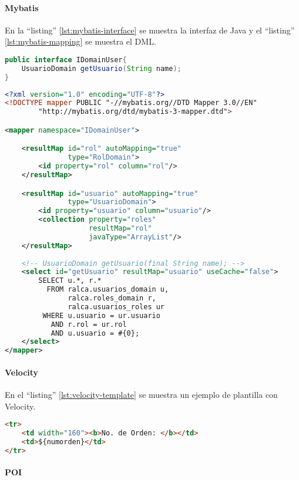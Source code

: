 \paragraph{Mybatis}\cite{MyBatis}
En la ``listing'' \ref{lst:mybatis-interface} se muestra la interfaz de Java y el ``listing'' \ref{lst:mybatis-mapping} se muestra el DML. 
\begin{lstlisting}[language=Java, caption={Ejemplo de MyBatis}, label={lst:mybatis-interface}]
public interface IDomainUser{
	UsuarioDomain getUsuario(String name);
}
\end{lstlisting}

\begin{lstlisting}[language=XML, caption={Ejemplo de MyBatis}, label={lst:mybatis-mapping}]
<?xml version="1.0" encoding="UTF-8"?>
<!DOCTYPE mapper PUBLIC "-//mybatis.org//DTD Mapper 3.0//EN"
		"http://mybatis.org/dtd/mybatis-3-mapper.dtd">

<mapper namespace="IDomainUser">

	<resultMap id="rol" autoMapping="true"
			   type="RolDomain">
		<id property="rol" column="rol"/>
	</resultMap>

	<resultMap id="usuario" autoMapping="true"
			   type="UsuarioDomain">
		<id property="usuario" column="usuario"/>
		<collection property="roles"
					resultMap="rol"
					javaType="ArrayList"/>
	</resultMap>
	
	<!-- UsuarioDomain getUsuario(final String name); -->
	<select id="getUsuario" resultMap="usuario" useCache="false">
		SELECT u.*, r.*
		  FROM ralca.usuarios_domain u,
		       ralca.roles_domain r,
		       ralca.usuarios_roles ur
		 WHERE u.usuario = ur.usuario
		   AND r.rol = ur.rol
		   AND u.usuario = #{0};
	</select>
</mapper>
\end{lstlisting}



\paragraph{Velocity}
En el ``listing'' \ref{lst:velocity-template} se muestra un ejemplo de plantilla con Velocity.
\begin{lstlisting}[language=HTML, caption={Ejemplo de plantilla de Velocity}, label={lst:velocity-template}]
<tr>
	<td width="160"><b>No. de Orden: </b></td>
	<td>${numorden}</td>
</tr>
\end{lstlisting}

\paragraph{POI}

